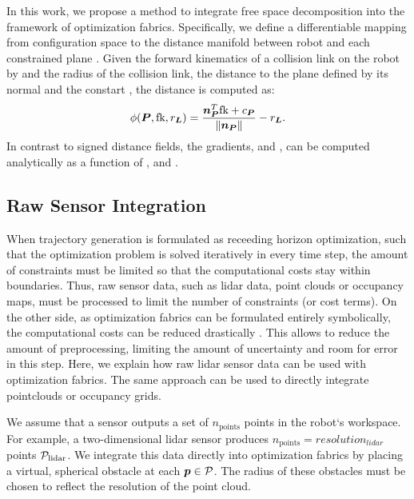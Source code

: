 In this work, we propose a method to integrate free space
decomposition into the framework of optimization \ac{fabrics}. Specifically, we
define a differentiable mapping from configuration space \Q{} to the distance
manifold between robot and each constrained plane \plane{}. Given the forward
kinematics of a collision link on the robot by \fk{} and the radius of the
collision link, the distance to the plane \plane{} defined by its normal
\np{} and the constart \cp{}, the distance is computed as:
\begin{equation}
  \phi({\bm{P},\textrm{fk},r_{\bm{L}}}) = \frac{\bm{n}_{\bm{P}}^T\textrm{fk} + c_{\bm{P}}}{\left\lVert\bm{n}_{\bm{P}}\right\rVert} - r_{\bm{L}}
  \label{eq:point_plane_distance}.
\end{equation}
In contrast to signed distance fields, the gradients, \J{} and \Jdot{}, can be
computed analytically as a function of \q{}, \np{} and \cp{}.



\subsection{Raw Sensor Integration}
\label{sub:raw_sensor_integration}


When trajectory generation is formulated as receeding horizon optimization, such
that the optimization problem is solved iteratively in every time step, the
amount of constraints must be limited so that the computational costs stay
within boundaries. Thus, raw sensor data, such as lidar data, point clouds or 
occupancy maps, must be processed to limit the number of constraints (or cost
terms). On the other side, as optimization \ac{fabrics} can be formulated entirely
symbolically, the computational costs can be reduced drastically
\cite{Spahn2023}. This allows to reduce the amount of preprocessing,
limiting the amount of uncertainty and room for error in this step. Here, we
explain how raw lidar sensor data can be used with optimization \ac{fabrics}.
The same approach can be used to directly integrate pointclouds or occupancy
grids.

We assume that a sensor outputs a set of $n_{\textrm{points}}$
points \pointcloud{} in the robot`s workspace. For example, a two-dimensional
lidar sensor produces $n_{\textrm{points}}=resolution_{lidar}$ points
$\mathcal{P}_{\textrm{lidar}}$. We integrate this data directly into
optimization \ac{fabrics} by placing a virtual, spherical obstacle at each $\bm{p}
\in \mathcal{P}$. The radius of these obstacles must be chosen to reflect the
resolution of the point cloud.




